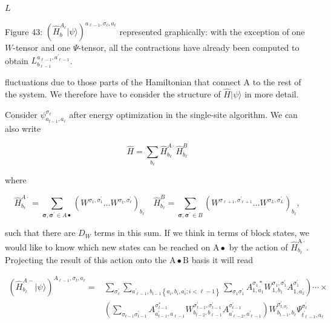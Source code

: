 \documentclass[12pt]{article}
\begin{document}
$L$

Figure 43: $\left(\hat{H}_{b}^{A_{\ell}}|\psi\rangle\right)^{a_{\ell-1}, \sigma_{\ell}, a_{\ell}}$ represented graphically: with the exception of one $W$-tensor and one $\Psi$-tensor, all the contractions have already been computed to obtain $L_{b_{\ell-1}}^{a_{\ell-1}, a_{\ell-1}^{\prime}}$.

fluctuations due to those parts of the Hamiltonian that connect A to the rest of the system. We therefore have to consider the structure of $\hat{H}|\psi\rangle$ in more detail.

Consider $\psi_{a_{t-1}, a_{\ell}}^{\sigma_{\ell}}$ after energy optimization in the single-site algorithm. We can also write


\begin{equation*}
\hat{H}=\sum_{b_{\ell}} \hat{H}_{b_{\ell}}^{A \cdot} \hat{H}_{b_{\ell}}^{B} \tag{213}
\end{equation*}


where


\begin{equation*}
\hat{H}_{b_{\ell}}^{A \cdot}=\sum_{\boldsymbol{\sigma}, \boldsymbol{\sigma}^{\prime} \in A \bullet}\left(W^{\sigma_{1}, \sigma_{1}^{\prime}} \ldots W^{\sigma_{t}, \sigma_{\ell}^{\prime}}\right)_{b_{\ell}} \quad \hat{H}_{b_{\ell}}^{B}=\sum_{\boldsymbol{\sigma}, \boldsymbol{\sigma}^{\prime} \in B}\left(W^{\sigma_{\ell+1}, \sigma_{\ell+1}^{\prime}} \ldots W^{\sigma_{L}, \sigma_{L}^{\prime}}\right)_{b_{\ell}}, \tag{214}
\end{equation*}


such that there are $D_{W}$ terms in this sum. If we think in terms of block states, we would like to know which new states can be reached on $\mathrm{A} \bullet$ by the action of $\hat{H}_{b_{\ell}}^{\mathrm{A} \cdot}$. Projecting the result of this action onto the $\mathrm{A} \bullet \mathrm{B}$ basis it will read


\begin{align*}
\left(\hat{H}_{b_{\ell}}^{A-}|\psi\rangle\right)^{A_{\ell-1}, \sigma_{t}, a_{\ell}}= & \left.\sum_{\sigma_{\ell}^{\prime}} \sum_{a_{\ell-1}^{\prime}, b_{t-1}\left\{a_{i}, b_{i}, a_{i}^{\prime} ; i<\ell-1\right\}} \sum_{\sigma_{1} \sigma_{1}^{\prime}} A_{1, a_{1}}^{\sigma_{1} *} W_{1, b_{1}}^{\sigma_{1}, \sigma_{1}^{\prime}} A_{1, a_{1}^{\prime}}^{\sigma_{1}^{\prime}}\right) \cdots \times \\
& \left(\sum_{\sigma_{t-1} \sigma_{t-1}^{\prime}} A_{a_{t-1}^{\prime}, a_{\ell-1}}^{\sigma_{t-1}^{*}} W_{b_{t-2}, b_{\ell-1}}^{\sigma_{t-1}^{\prime}, \sigma_{t-1}^{\prime}} A_{a_{\ell-2}^{\prime}, a_{\ell-1}^{\prime}}^{\sigma_{t-1}^{\prime}}\right) W_{b_{t-1}, b_{\ell}}^{\sigma_{t, \sigma_{t}^{\prime}}^{\prime}} \Psi_{t_{\ell-1}^{\prime}, a_{\ell}}^{\sigma_{\ell}^{\prime}} \tag{215}
\end{align*}
\end{document}
